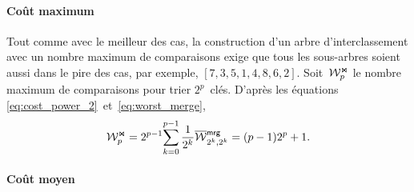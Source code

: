 \paragraph{Coût maximum}

Tout comme avec le meilleur des cas, la construction d'un arbre
d'interclassement avec un nombre maximum de comparaisons exige que
tous les sous-arbres soient aussi dans le pire des cas, par exemple,
\([7,3,5,1,4,8,6,2]\). Soit~\(\mathcal{W}_{p}^{\Join}\) le nombre maximum de
comparaisons pour trier \(2^p\)~clés. D'après les équations
\eqref{eq:cost_power_2}~et~\eqref{eq:worst_merge},
\begin{equation}
\W{\Join}{p}
  = 2^{p-1}\!\sum_{k=0}^{p-1}{\frac{1}{2^k}\OW{\fun{mrg}}{2^k,2^k}}
  = (p-1)2^p + 1.
\label{eq:worst_power}\index{mrg@$\W{\Join}{n}$}
\end{equation}

\paragraph{Coût moyen}
\label{par:Atms_2p}


